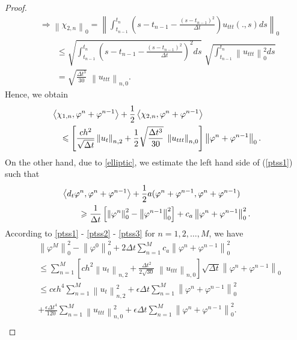 \documentclass[notitlepage,a4paper,fleqn,9pt]{icmfarticle}
\begin{document}
\begin{multicols}{2}
\begin{proof}
	\begin{align*}
		&\Rightarrow\left\|\chi_{2, n}\right\|_0=\left\|\int_{t_{n-1}}^{t_n}\left(s-t_{n-1}-\frac{(s-t_{n-1})^2}{\Delta t}\right)u_{ttt}(.,s)ds\right\|_0\\
		&\qquad\leq\sqrt{\int_{t_{n-1}}^{t_n}\left(s-t_{n-1}-\frac{(s-t_{n-1})^2}{\Delta t}\right)^2ds}\;\sqrt{\int_{t_{n-1}}^{t_n}\left\|u_{ttt}\right\|^2_0ds }\\
		&\qquad=\sqrt{\frac{\Delta t^3}{30}}\;\left\|u_{ttt}\right\|_{n, 0}.
	\end{align*}
	Hence, we obtain
	\begin{align}\label{ptss2}
		&\left\langle \chi_{1, n}, \varphi^n+\varphi^{n-1}\right\rangle+\frac{1}{2}\left\langle \chi_{2, n}, \varphi^n+\varphi^{n-1}\right\rangle\notag\\
		&\quad\leq\left[\frac{ch^2}{\sqrt{\Delta t}}\left\|u_t\right\|_{n, 2}+\frac{1}{2}\sqrt{\frac{\Delta t^3}{30}}\;\left\|u_{ttt}\right\|_{n, 0}\right]\left\|\varphi^n+\varphi^{n-1}\right\|_0.
	\end{align} 
	On the other hand, due to \eqref{elliptic}, we estimate the left hand side of  (\ref{ptss1}) such that
	\begin{align}\label{ptss3}
		&\left\langle d_t\varphi^n, \varphi^n+\varphi^{n-1}\right\rangle +\frac{1}{2}a(\varphi^n+\varphi^{n-1}, \varphi^n+\varphi^{n-1})\notag\\
		&\qquad\geq\frac{1}{\Delta t}\left[\left\|\varphi^n\right\|^2_0-\left\|\varphi^{n-1}\right\|^2_0\right]+c_a\left\|\varphi^n+\varphi^{n-1}\right\|^2_0.
	\end{align}
	According to \eqref{ptss1} - \eqref{ptss2} - \eqref{ptss3} for $n=1, 2,\dots, M$, we have 
	\begin{align*}
		&\left\|\varphi^M\right\|^2_0-\left\|\varphi^{0}\right\|^2_0+2\Delta t\sum_{n=1}^{M}c_a\left\|\varphi^n+\varphi^{n-1}\right\|^2_0\\
		&\leq\sum_{n=1}^{M}\left[ch^2\left\|u_t\right\|_{n, 2}+\frac{\Delta t^2}{2\sqrt{30}}\;\left\|u_{ttt}\right\|_{n, 0}\right]\sqrt{\Delta t}\left\|\varphi^n+\varphi^{n-1}\right\|_0\\
		&\leq c\epsilon h^4\sum_{n=1}^{M}\left\|u_t\right\|_{n, 2}^2+\epsilon \Delta t\sum_{n=1}^{M}\left\|\varphi^n+\varphi^{n-1}\right\|^2_0\\
		&+\frac{\epsilon\Delta t^4}{120}\sum_{n=1}^{M}\left\|u_{ttt}\right\|_{n, 0}^2+\epsilon \Delta t\sum_{n=1}^{M}\left\|\varphi^n+\varphi^{n-1}\right\|^2_0.
	\end{align*}
	\begin{align*}

\end{align*}
\end{proof}
\end{multicols}
\end{document}
